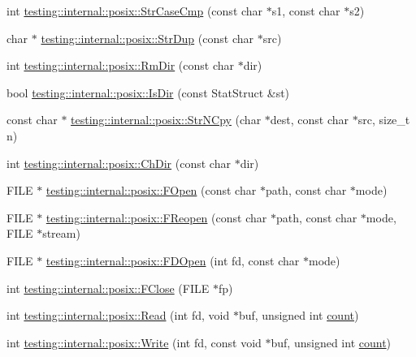 \begin{DoxyCompactItemize}
int \hyperlink{namespacetesting_1_1internal_1_1posix_a1ef2385a7f8e4c706054da35967e76bd}{testing\+::internal\+::posix\+::\+Str\+Case\+Cmp} (const char $\ast$s1, const char $\ast$s2)
\item 
char $\ast$ \hyperlink{namespacetesting_1_1internal_1_1posix_a8e352884793a65ae8be144676f1a9136}{testing\+::internal\+::posix\+::\+Str\+Dup} (const char $\ast$src)
\item 
int \hyperlink{namespacetesting_1_1internal_1_1posix_acbad5d4ea5b73fd1765f5f760642932a}{testing\+::internal\+::posix\+::\+Rm\+Dir} (const char $\ast$dir)
\item 
bool \hyperlink{namespacetesting_1_1internal_1_1posix_af0d04ed5baeed28353fa38742748a421}{testing\+::internal\+::posix\+::\+Is\+Dir} (const Stat\+Struct \&st)
\item 
const char $\ast$ \hyperlink{namespacetesting_1_1internal_1_1posix_a36fca815713332e5c6dc92c98b6b2574}{testing\+::internal\+::posix\+::\+Str\+N\+Cpy} (char $\ast$dest, const char $\ast$src, size\+\_\+t n)
\item 
int \hyperlink{namespacetesting_1_1internal_1_1posix_a1ddc8a4fc6bb21da372307485591a212}{testing\+::internal\+::posix\+::\+Ch\+Dir} (const char $\ast$dir)
\item 
F\+I\+LE $\ast$ \hyperlink{namespacetesting_1_1internal_1_1posix_a4042201dcc4932641d484e7ddf94de7d}{testing\+::internal\+::posix\+::\+F\+Open} (const char $\ast$path, const char $\ast$mode)
\item 
F\+I\+LE $\ast$ \hyperlink{namespacetesting_1_1internal_1_1posix_a9ef6d089cdae03f9d9e0e6d379c40703}{testing\+::internal\+::posix\+::\+F\+Reopen} (const char $\ast$path, const char $\ast$mode, F\+I\+LE $\ast$stream)
\item 
F\+I\+LE $\ast$ \hyperlink{namespacetesting_1_1internal_1_1posix_af7c268eba32d5a718b36b6b3801302e0}{testing\+::internal\+::posix\+::\+F\+D\+Open} (int fd, const char $\ast$mode)
\item 
int \hyperlink{namespacetesting_1_1internal_1_1posix_af4beeaaa8d62916d5e3b644a1ddfbd6b}{testing\+::internal\+::posix\+::\+F\+Close} (F\+I\+LE $\ast$fp)
\item 
int \hyperlink{namespacetesting_1_1internal_1_1posix_a3c6ab13e581a56f1b02f3eb7536c97fd}{testing\+::internal\+::posix\+::\+Read} (int fd, void $\ast$buf, unsigned int \hyperlink{gmock__stress__test_8cc_afd9db40e3361ae09188795e8cbe19752}{count})
\item 
int \hyperlink{namespacetesting_1_1internal_1_1posix_af4acf9f78d55f815a18b43786511abef}{testing\+::internal\+::posix\+::\+Write} (int fd, const void $\ast$buf, unsigned int \hyperlink{gmock__stress__test_8cc_afd9db40e3361ae09188795e8cbe19752}{count})

\end{DoxyCompactItemize}
